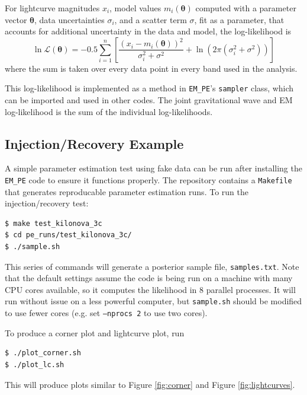 \documentclass{article}
\begin{document}
For lightcurve magnitudes $x_i$, model values $m_i(\bm{\theta})$ computed with a parameter vector $\bm{\theta}$, data uncertainties $\sigma_i$, and a scatter term $\sigma$, fit as a parameter, that accounts for additional uncertainty in the data and model, the log-likelihood is
\begin{equation}
    \ln \mathcal{L}(\bm{\theta}) = -0.5 \sum_{i=1}^n \left [ \frac {(x_i - m_i(\bm{\theta}))^2} {\sigma_i^2 + \sigma^2} + \ln(2 \pi (\sigma_i^2 + \sigma^2)) \right ]
\end{equation}
where the sum is taken over every data point in every band used in the analysis.

This log-likelihood is implemented as a method in \texttt{EM\_PE}'s \texttt{sampler} class, which can be imported and used in other codes.
The joint gravitational wave and EM log-likelihood is the sum of the individual log-likelihoods.

\subsection{Injection/Recovery Example}

A simple parameter estimation test using fake data can be run after installing the \texttt{EM\_PE} code to ensure it functions properly.
The repository contains a \texttt{Makefile} that generates reproducable parameter estimation runs.
To run the injection/recovery test:
\begin{verbatim}
$ make test_kilonova_3c
$ cd pe_runs/test_kilonova_3c/
$ ./sample.sh
\end{verbatim}
This series of commands will generate a posterior sample file, \texttt{samples.txt}.
Note that the default settings assume the code is being run on a machine with many CPU cores available, so it computes the likelihood in 8 parallel processes.
It will run without issue on a less powerful computer, but \texttt{sample.sh} should be modified to use fewer cores (e.g. set \texttt{--nprocs 2} to use two cores).

To produce a corner plot and lightcurve plot, run
\begin{verbatim}
$ ./plot_corner.sh
$ ./plot_lc.sh
\end{verbatim}
This will produce plots similar to Figure \ref{fig:corner} and Figure \ref{fig:lightcurves}.
\end{document}
